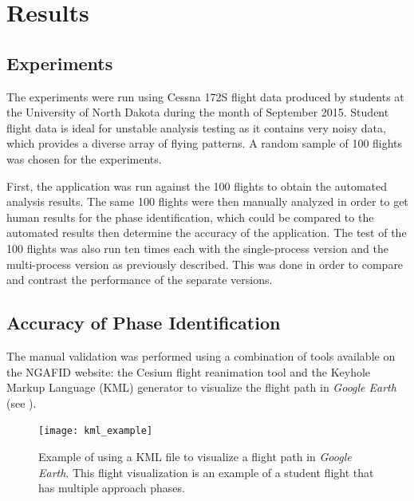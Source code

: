 
\chapter{Results} \label{ch:results}

\section{Experiments}

	The experiments were run using Cessna 172S flight data produced by students at the University of North Dakota during the month of September 2015.  Student flight data is ideal for unstable analysis testing as it contains very noisy data, which provides a diverse array of flying patterns.  A random sample of 100 flights was chosen for the experiments.
        
    First, the application was run against the 100 flights to obtain the automated analysis results.  The same 100 flights were then manually analyzed in order to get human results for the phase identification, which could be compared to the automated results then determine the accuracy of the application.  The test of the 100 flights was also run ten times each with the single-process version and the multi-process version as previously described.  This was done in order to compare and contrast the performance of the separate versions.


\section{Accuracy of Phase Identification}

	The manual validation was performed using a combination of tools available on the NGAFID website:  the Cesium flight reanimation tool and the Keyhole Markup Language (KML) generator to visualize the flight path in \textit{Google Earth}~\cite{nolan2014keyhole} (see ).
    
    \begin{figure}
    	\centering
        \texttt{[image: kml\_example]}
        \caption{Example of using a KML file to visualize a flight path in \textit{Google Earth}.  This flight visualization is an example of a student flight that has multiple approach phases.}
        \label{fig:kml_example}
    \end{figure}
    
